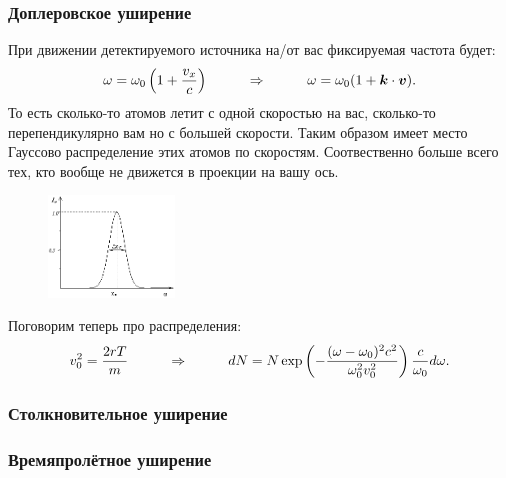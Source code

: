 \subsubsection*{Доплеровское уширение}
При движении детектируемого источника на/от вас фиксируемая частота будет:
\begin{equation*}
	\omega = \omega_0 \left(1 + \frac{v_x}{c}\right)
	\hspace{1 cm}
	\Rightarrow
	\hspace{1 cm}
	\omega = \omega_0 (1 + \mbox{\boldmath $k$} \cdot \mbox{\boldmath $v$}).
\end{equation*}
То есть сколько-то атомов летит с одной скоростью на вас, сколько-то перепендикулярно вам но с большей скорости. Таким образом имеет место Гауссово распределение этих атомов по скоростям. Соотвественно больше всего тех, кто вообще не движется в проекции на вашу ось.
\begin{figure}[ht]
    \centering
    \includegraphics[width=0.3\textwidth]{img/ushir.jpg}
\end{figure}


Поговорим теперь про распределения:
\begin{equation*}
	v_0^2 = \frac{2 r T }{m}
	\hspace{1 cm}
	\Rightarrow
	\hspace{1 cm}
	d N =  N \exp\left( - \frac{(\omega - \omega_0)^2 c^2}{\omega_0^2 v_0^2}\right)\frac{c}{\omega_0} d \omega.
\end{equation*}

\subsubsection*{Столкновительное уширение}
\subsubsection*{Времяпролётное уширение}

